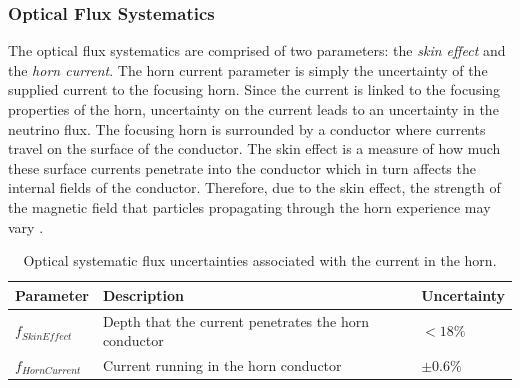 \subsubsection*{Optical Flux Systematics}
The optical flux systematics are comprised of two parameters: the \textit{skin effect} and the \textit{horn current}. The horn current parameter is simply the uncertainty of the supplied current to the focusing horn. Since the current is linked to the focusing properties of the horn, uncertainty on the current leads to an uncertainty in the neutrino flux. The focusing horn is surrounded by a conductor where currents travel on the surface of the conductor. The skin effect is a measure of how much these surface currents penetrate into the conductor which in turn affects the internal fields of the conductor. Therefore, due to the skin effect, the strength of the magnetic field that particles propagating through the horn experience may vary \cite{BNB_flux}.

\begin{table}[!h]
  \renewcommand{\arraystretch}{1.4}    
  \begin{tabular}{p{2.5cm} p{7.8cm} p{2.2cm}}

    \toprule
    Parameter & Description & Uncertainty \\ 
    \midrule

    $f_{SkinEffect}$  & Depth that the current penetrates the horn conductor & $<18 \%$\\

    $f_{HornCurrent}$ & Current running in the horn conductor & $\pm 0.6 \%$\\
    \bottomrule

  \end{tabular}
  \caption[Optical, beam focusing flux systematic parameters.]{Optical systematic flux uncertainties associated with the current in the horn\cite{BNB_flux}.}
\end{table}

\newpage
